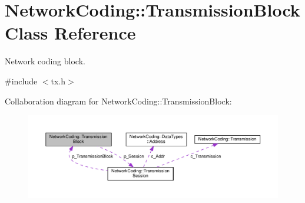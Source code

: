 \hypertarget{class_network_coding_1_1_transmission_block}{}\section{Network\+Coding\+:\+:Transmission\+Block Class Reference}
\label{class_network_coding_1_1_transmission_block}


Network coding block.  




{\ttfamily \#include $<$tx.\+h$>$}



Collaboration diagram for Network\+Coding\+:\+:Transmission\+Block\+:\nopagebreak
\begin{figure}[H]
\begin{center}
\leavevmode
\includegraphics[width=350pt]{class_network_coding_1_1_transmission_block__coll__graph}
\end{center}
\end{figure}
